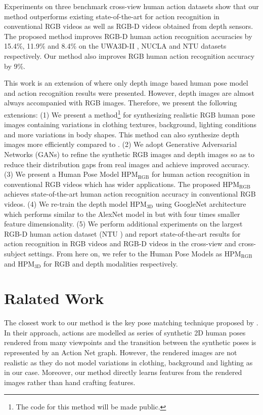 \documentclass[twocolumn]{svjour3}          \smartqed  \usepackage{graphicx}
\begin{document}
Experiments on three benchmark cross-view human action datasets show that our method outperforms existing state-of-the-art for action recognition in conventional RGB videos as well as RGB-D videos obtained from depth sensors. The proposed method improves RGB-D human action recognition accuracies by 15.4\%, 11.9\% and 8.4\% on the UWA3D-II \citep{HOPC2016PAMI}, NUCLA \citep{AOG} and NTU \citep{shahroudy2016ntu} datasets respectively. Our method also improves RGB human action recognition accuracy by 9\%.

This work is an extension of \citep{HPM+TM} where only depth image based human pose model and action recognition results were presented. However, depth images are almost always accompanied with RGB images. Therefore, we present the following extensions: (1) We present a method\footnote{The code for this method will be made public.} for synthesizing realistic RGB human pose images containing variations in clothing textures, background, lighting conditions and more variations in body shapes. This method can also synthesize depth images more efficiently compared to \citep{HPM+TM}. (2) We adopt Generative Adversarial Networks (GANs) to refine the synthetic RGB images and depth images so as to reduce their distribution gaps from real images and achieve improved accuracy. (3) We present a Human Pose Model HPM$_{\mathrm{RGB}}$ for human action recognition in conventional RGB videos which has wider applications. The proposed HPM$_{\mathrm{RGB}}$ achieves state-of-the-art human action recognition accuracy in conventional RGB videos. (4) We re-train the depth model HPM$_{\mathrm{3D}}$ using GoogleNet \citep{GoogLeNet} architecture which performs similar to the AlexNet \citep{AlexNet} model in \citep{HPM+TM} but with four times smaller feature dimensionality. (5) We perform additional experiments on the largest RGB-D human action dataset (NTU \citep{shahroudy2016ntu}) and report state-of-the-art results for action recognition in RGB videos and RGB-D videos in the cross-view and cross-subject settings. From here on, we refer to the Human Pose Models as HPM$_{\mathrm{RGB}}$ and HPM$_{\mathrm{3D}}$ for RGB and depth modalities respectively.



\section{Ralated Work}
The closest work to our method is the key pose matching technique proposed by \citet{lv2007single}. In their approach, actions are modelled as series of synthetic 2D human poses rendered from many viewpoints and the transition between the synthetic poses is represented by an Action Net graph. However, the rendered images are not realistic as they do not model variations in clothing, background and lighting as in our case. Moreover, our method directly learns features from the rendered images rather than hand crafting features.
\end{document}
